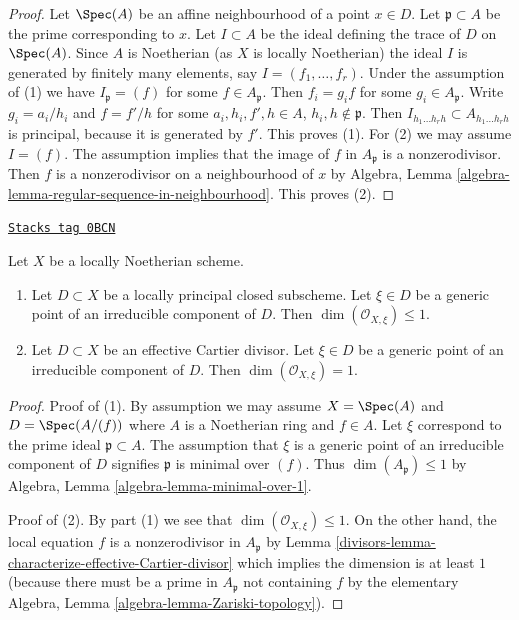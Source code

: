 \begin{proof}
Let $\Spec(A)$ be an affine neighbourhood of a point $x \in D$.
Let $\mathfrak p \subset A$ be the prime corresponding to $x$.
Let $I \subset A$ be the ideal defining the trace of $D$ on
$\Spec(A)$. Since $A$ is Noetherian (as $X$ is locally Noetherian)
the ideal $I$ is generated by finitely many elements, say
$I = (f_1, \ldots, f_r)$. Under the assumption of (1) we have
$I_\mathfrak p = (f)$ for some $f \in A_\mathfrak p$.
Then $f_i = g_i f$ for some $g_i \in A_\mathfrak p$.
Write $g_i = a_i/h_i$ and $f = f'/h$ for some
$a_i, h_i, f', h \in A$, $h_i, h \not \in \mathfrak p$.
Then $I_{h_1 \ldots h_r h} \subset A_{h_1 \ldots h_r h}$ is
principal, because it is generated by $f'$. This proves (1).
For (2) we may assume $I = (f)$. The assumption implies
that the image of $f$ in $A_\mathfrak p$ is a nonzerodivisor.
Then $f$ is a nonzerodivisor on a neighbourhood of $x$ by
Algebra, Lemma \ref{algebra-lemma-regular-sequence-in-neighbourhood}.
This proves (2).
\end{proof}

\begin{lemma}
\label{divisors-lemma-effective-Cartier-codimension-1}
\href{https://stacks.math.columbia.edu/tag/0BCN}{\texttt{Stacks tag 0BCN}}

Let $X$ be a locally Noetherian scheme.
\begin{enumerate}
\item Let $D \subset X$ be a locally principal closed subscheme.
Let $\xi \in D$ be a generic point of an irreducible component of $D$.
Then $\dim(\mathcal{O}_{X, \xi}) \leq 1$.
\item Let $D \subset X$ be an effective Cartier divisor.
Let $\xi \in D$ be a generic point of an irreducible component of $D$.
Then $\dim(\mathcal{O}_{X, \xi}) = 1$.
\end{enumerate}
\end{lemma}

\begin{proof}

Proof of (1). By assumption we may assume $X = \Spec(A)$ and
$D = \Spec(A/(f))$ where $A$ is a Noetherian ring and $f \in A$.
Let $\xi$ correspond to the prime ideal $\mathfrak p \subset A$.
The assumption that $\xi$ is a generic point of an irreducible
component of $D$ signifies $\mathfrak p$ is minimal over $(f)$.
Thus $\dim(A_\mathfrak p) \leq 1$ by
Algebra, Lemma \ref{algebra-lemma-minimal-over-1}.

\medskip\noindent
Proof of (2). By part (1) we see that $\dim(\mathcal{O}_{X, \xi}) \leq 1$.
On the other hand, the local equation $f$ is a nonzerodivisor in
$A_\mathfrak p$ by Lemma \ref{divisors-lemma-characterize-effective-Cartier-divisor}
which implies the dimension is at least $1$ (because there must be a
prime in $A_\mathfrak p$ not containing $f$ by the elementary
Algebra, Lemma \ref{algebra-lemma-Zariski-topology}).
\end{proof}

